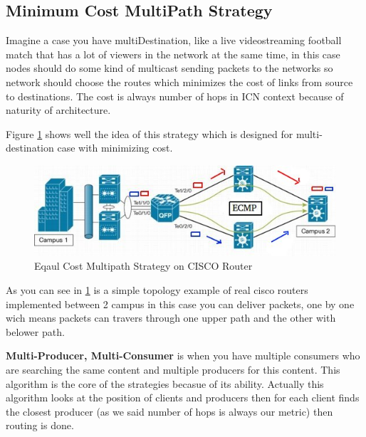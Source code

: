 \subsection{Minimum Cost MultiPath Strategy}
Imagine a case you have multiDestination, like a live videostreaming football match that has a lot of viewers in the network at the same time, in this case nodes should do some kind of multicast sending packets to the networks so network should choose the routes which minimizes the cost of links from source to destinations. The cost is always number of hops in ICN context because of naturity of architecture. 

Figure \ref{balance} shows well the idea of this strategy which is designed for multi-destination case with minimizing cost.

\begin{figure}[H]

\begin{center}

\includegraphics[scale = 0.7]{Pictures/balance.jpg}

\caption{Eqaul Cost Multipath Strategy on CISCO Router} \label{balance} 

\end{center}

\end{figure}

As you can see in \ref{balance} is a simple topology example of real cisco routers implemented between 2 campus in this case you can deliver packets, one by one wich means packets can travers through one upper path and the other with belower path.

\textbf{Multi-Producer, Multi-Consumer} is when you have multiple consumers who are searching the same content and multiple producers for this content. This algorithm is the core of the strategies becasue of its ability. Actually this algorithm looks at the position of clients and producers then for each client finds the closest producer (as we said number of hops is always our metric) then routing is done.



